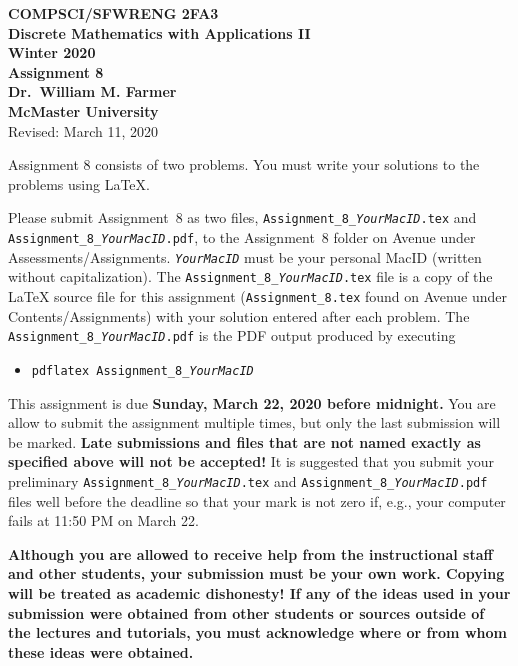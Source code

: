 \documentclass[11pt,fleqn]{article}
\begin{document}
\begin{center}

  {\large \textbf{COMPSCI/SFWRENG 2FA3}}\\[2mm]
  {\large \textbf{Discrete Mathematics with Applications II}}\\[2mm]
  {\large \textbf{Winter 2020}}\\[8mm]
  {\huge \textbf{Assignment 8}}\\[6mm]
  {\large \textbf{Dr.~William M. Farmer}}\\[2mm]
  {\large \textbf{McMaster University}}\\[6mm]
  {\large Revised: March 11, 2020}

\end{center}

\medskip

Assignment 8 consists of two problems.  You must write your solutions
to the problems using LaTeX.

Please submit Assignment~8 as two files,
\texttt{Assignment\_8\_\emph{YourMacID}.tex} and
\texttt{Assignment\_8\_\emph{YourMacID}.pdf}, to the Assignment~8
folder on Avenue under Assessments/Assignments.
\texttt{\emph{YourMacID}} must be your personal MacID (written without
capitalization).  The \texttt{Assignment\_8\_\emph{YourMacID}.tex}
file is a copy of the LaTeX source file for this assignment
(\texttt{Assignment\_8.tex} found on Avenue under
Contents/Assignments) with your solution entered after each problem.
The \texttt{Assignment\_8\_\emph{YourMacID}.pdf} is the PDF output
produced by executing

\begin{itemize}

  \item[] \texttt{pdflatex Assignment\_8\_\emph{YourMacID}}

\end{itemize}

This assignment is due \textbf{Sunday, March 22, 2020 before
  midnight.}  You are allow to submit the assignment multiple times,
but only the last submission will be marked.  \textbf{Late submissions
  and files that are not named exactly as specified above will not be
  accepted!}  It is suggested that you submit your preliminary
\texttt{Assignment\_8\_\emph{YourMacID}.tex} and
\texttt{Assignment\_8\_\emph{YourMacID}.pdf} files well before the
deadline so that your mark is not zero if, e.g., your computer fails
at 11:50 PM on March 22.

\textbf{Although you are allowed to receive help from the
  instructional staff and other students, your submission must be your
  own work.  Copying will be treated as academic dishonesty! If any of
  the ideas used in your submission were obtained from other students
  or sources outside of the lectures and tutorials, you must
  acknowledge where or from whom these ideas were obtained.}
\end{document}
